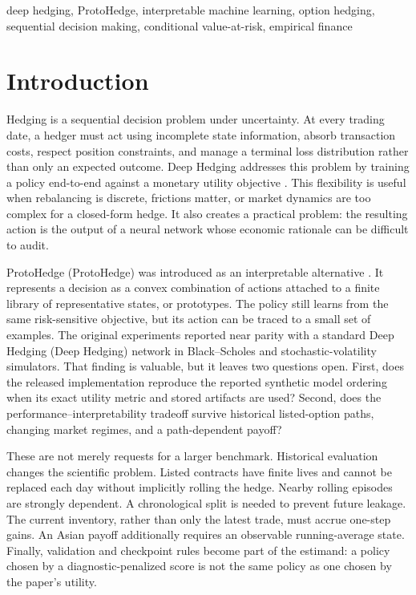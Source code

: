 \documentclass[conference]{IEEEtran}
\newcommand{\ProtoH}{ProtoHedge}
\newcommand{\DeepH}{Deep Hedging}
\begin{document}
\begin{IEEEkeywords}
deep hedging, ProtoHedge, interpretable machine learning, option hedging,
sequential decision making, conditional value-at-risk, empirical finance
\end{IEEEkeywords}

\section{Introduction}

Hedging is a sequential decision problem under uncertainty. At every trading
date, a hedger must act using incomplete state information, absorb transaction
costs, respect position constraints, and manage a terminal loss distribution
rather than only an expected outcome. Deep Hedging addresses this problem by
training a policy end-to-end against a monetary utility objective
\cite{buehler2019deep}. This flexibility is useful when rebalancing is discrete,
frictions matter, or market dynamics are too complex for a closed-form hedge.
It also creates a practical problem: the resulting action is the output of a
neural network whose economic rationale can be difficult to audit.

ProtoHedge (\ProtoH) was introduced as an interpretable alternative
\cite{faloughi2025protohedge}. It represents a decision as a convex combination
of actions attached to a finite library of representative states, or
prototypes. The policy still learns from the same risk-sensitive objective, but
its action can be traced to a small set of examples. The original experiments
reported near parity with a standard Deep Hedging (\DeepH) network in
Black--Scholes and stochastic-volatility simulators. That finding is valuable,
but it leaves two questions open. First, does the released implementation
reproduce the reported synthetic model ordering when its exact utility metric
and stored artifacts are used? Second, does the performance--interpretability
tradeoff survive historical listed-option paths, changing market regimes, and
a path-dependent payoff?

These are not merely requests for a larger benchmark. Historical evaluation
changes the scientific problem. Listed contracts have finite lives and cannot
be replaced each day without implicitly rolling the hedge. Nearby rolling
episodes are strongly dependent. A chronological split is needed to prevent
future leakage. The current inventory, rather than only the latest trade, must
accrue one-step gains. An Asian payoff additionally requires an observable
running-average state. Finally, validation and checkpoint rules become part of
the estimand: a policy chosen by a diagnostic-penalized score is not the same
policy as one chosen by the paper's utility.
\end{document}
